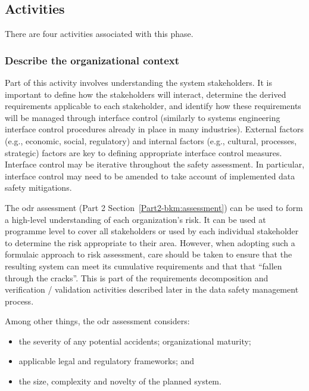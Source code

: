\subsection{Activities}
There are four activities associated with this phase.

\subsubsection{Describe the organizational context}
Part of this activity involves understanding the system \glspl{stakeholder}. It is important to define how the \glspl{stakeholder} will interact, determine the derived requirements applicable to each \gls{stakeholder}, and identify how these requirements will be managed through interface control (similarly to systems engineering interface control procedures already in place in many industries). External factors (e.g., economic, social, regulatory) and internal factors (e.g., cultural, processes, strategic) factors are key to defining appropriate interface control measures. Interface control may be iterative throughout the \gls{safety assessment}. In particular, interface control may need to be amended to take account of implemented data safety \glspl{mitigation}.

The \gls{odr} assessment (Part 2 Section~\ref*{Part2-bkm:assessment}) can be used to form a high-level understanding of each organization's risk. It can be used at programme level to cover all \glspl{stakeholder} or used by each individual \gls{stakeholder} to determine the
risk appropriate to their area. However, when adopting such a formulaic approach to risk assessment, care should be taken 
to ensure that the resulting system can meet its cumulative requirements and that that ``fallen through the cracks''. This is part of the requirements decomposition and \gls{verification} / \gls{validation} activities described later in the data safety management process.

Among other things, the \gls{odr} assessment considers:
\begin{itemize}
	\item the severity of any potential accidents; organizational maturity; 
	\item applicable legal and regulatory frameworks; and 
	\item the size, complexity and novelty of the planned system.
\end{itemize}

